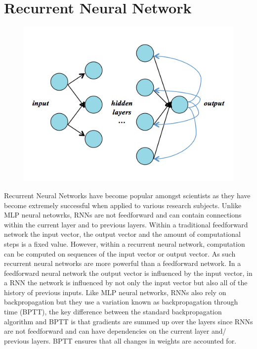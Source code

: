 \section{Recurrent Neural Network}
\begin{figure}[H]
\includegraphics[width=\columnwidth]{RNN}
\end{figure}
Recurrent Neural Networks have become popular amongst scientists as they have become extremely successful when applied to various research subjects.
Unlike MLP neural netowrks, RNNs are not feedforward and can contain connections within the current layer and to previous layers. Within a traditional feedforward network the input vector, the output vector and the amount of computational steps is a fixed value. However, within a recurrent neural network, computation can be computed on sequences of the input vector or output vector. As such recurrent neural networks are more powerful than a feedforward network. \cite{nicholson} \cite{olah} In a feedforward neural network the output vector is influenced by the input vector, in a RNN the network is influenced by not only the input vector but also all of the history of previous inputs. Like MLP neural networks, RNNs also rely on backpropagation but they use a variation known as backpropagation through time (BPTT), the key difference between the standard backpropagation algorithm and BPTT is that gradients are summed up over the layers since RNNs are not feedforward and can have dependencies on the current layer and/ previous layers. BPTT ensures that all changes in weights are accounted for. \cite{nicholson} \cite{olah}

